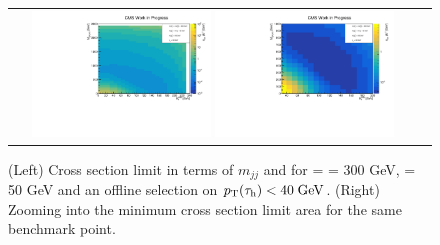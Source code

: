 \begin{figure}[tbh!]
	\centering
	\begin{tabular}{cc}
		\includegraphics[width=0.45\textwidth]{analysis/pics/JetInvMass_vs_MET_xsec_chi300_lsp050_taupt40.pdf}
		\includegraphics[width=0.45\textwidth]{analysis/pics/JetInvMass_vs_MET_xsec_chi300_lsp050_taupt40_zoom.pdf} 		
	\end{tabular}
	\caption{(Left) Cross section limit in terms of $m_{jj}$ and \met for \charginopm = \neutralinotwo = 300 GeV, \neutralinoone = 50 GeV and an offline selection on $p_{\text{T}}(\tau_{\text{h}}) <  40\;\text{Ge}\kern-0.06667em\text{V}$. (Right) Zooming into the minimum cross section limit area for the same benchmark point.}
	\label{fig::JetInvMass_vs_MET_xsec_chi300_lsp050_taupt40}
\end{figure}


